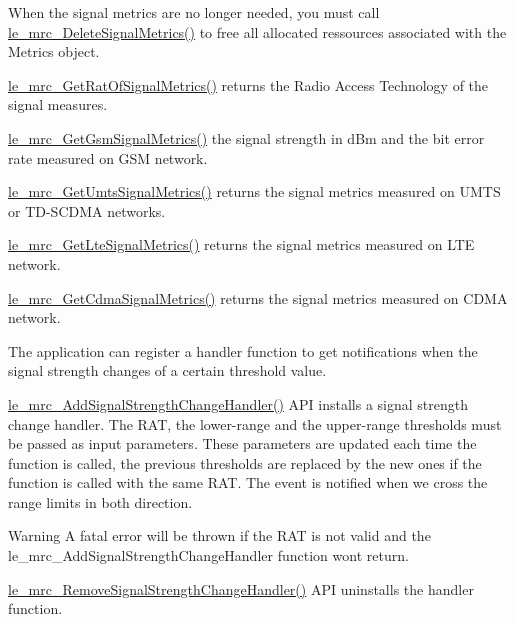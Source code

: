 When the signal metrics are no longer needed, you must call \hyperlink{le__mrc__interface_8h_a20addd98ee6cb07f9ee1a45be01b5203}{le\+\_\+mrc\+\_\+\+Delete\+Signal\+Metrics()} to free all allocated ressources associated with the Metrics object.

\hyperlink{le__mrc__interface_8h_a5564bace31c937bcef096e597f33d3a4}{le\+\_\+mrc\+\_\+\+Get\+Rat\+Of\+Signal\+Metrics()} returns the Radio Access Technology of the signal measures.

\hyperlink{le__mrc__interface_8h_a9d7243b29bf4c705c4eba83fa3799582}{le\+\_\+mrc\+\_\+\+Get\+Gsm\+Signal\+Metrics()} the signal strength in d\+Bm and the bit error rate measured on G\+SM network.

\hyperlink{le__mrc__interface_8h_a456648564abfc8e9711b60a5d8bddc9b}{le\+\_\+mrc\+\_\+\+Get\+Umts\+Signal\+Metrics()} returns the signal metrics measured on U\+M\+TS or T\+D-\/\+S\+C\+D\+MA networks.

\hyperlink{le__mrc__interface_8h_a030880c064afbf2686726fd2e538adfe}{le\+\_\+mrc\+\_\+\+Get\+Lte\+Signal\+Metrics()} returns the signal metrics measured on L\+TE network.

\hyperlink{le__mrc__interface_8h_a09ff33b24fd01be18a145b2b3f1f579a}{le\+\_\+mrc\+\_\+\+Get\+Cdma\+Signal\+Metrics()} returns the signal metrics measured on C\+D\+MA network.

The application can register a handler function to get notifications when the signal strength changes of a certain threshold value.

\hyperlink{le__mrc__interface_8h_ab62b444715b2b530efe5d397eb86a6e8}{le\+\_\+mrc\+\_\+\+Add\+Signal\+Strength\+Change\+Handler()} A\+PI installs a signal strength change handler. The R\+AT, the lower-\/range and the upper-\/range thresholds must be passed as input parameters. These parameters are updated each time the function is called, the previous thresholds are replaced by the new ones if the function is called with the same R\+AT. The event is notified when we cross the range limits in both direction.

\begin{DoxyWarning}{Warning}
A fatal error will be thrown if the R\+AT is not valid and the le\+\_\+mrc\+\_\+\+Add\+Signal\+Strength\+Change\+Handler function won\textquotesingle{}t return.
\end{DoxyWarning}
\hyperlink{le__mrc__interface_8h_ade04ec8db3b79c1555b3ab4bdb052216}{le\+\_\+mrc\+\_\+\+Remove\+Signal\+Strength\+Change\+Handler()} A\+PI uninstalls the handler function.

